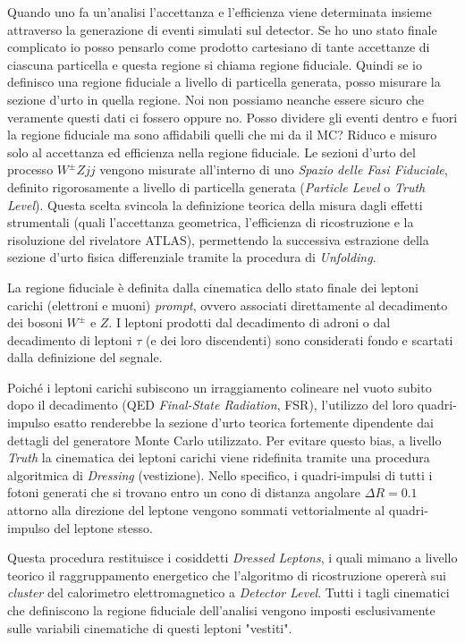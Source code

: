 \documentclass[11pt]{article}
\begin{document}
Quando uno fa un'analisi l'accettanza e l'efficienza viene determinata insieme attraverso la generazione di eventi simulati sul detector. Se ho uno stato finale complicato io posso pensarlo come prodotto cartesiano di tante accettanze di ciascuna particella e questa regione si chiama regione fiduciale. Quindi se io definisco una regione fiduciale a livello di particella generata, posso misurare la sezione d'urto in quella regione. Noi non possiamo neanche essere sicuro che veramente questi dati ci fossero oppure no. Posso dividere gli eventi dentro e fuori la regione fiduciale ma sono affidabili quelli che mi da il MC? Riduco e misuro solo al accettanza ed efficienza nella regione fiduciale.
Le sezioni d'urto del processo $W^\pm Zjj$ vengono misurate all'interno di uno \textit{Spazio delle Fasi Fiduciale}, definito rigorosamente a livello di particella generata (\textit{Particle Level} o \textit{Truth Level}). Questa scelta svincola la definizione teorica della misura dagli effetti strumentali (quali l'accettanza geometrica, l'efficienza di ricostruzione e la risoluzione del rivelatore ATLAS), permettendo la successiva estrazione della sezione d'urto fisica differenziale tramite la procedura di \textit{Unfolding}.

La regione fiduciale è definita dalla cinematica dello stato finale dei leptoni carichi (elettroni e muoni) \textit{prompt}, ovvero associati direttamente al decadimento dei bosoni $W^\pm$ e $Z$. I leptoni prodotti dal decadimento di adroni o dal decadimento di leptoni $\tau$ (e dei loro discendenti) sono considerati fondo e scartati dalla definizione del segnale.

Poiché i leptoni carichi subiscono un irraggiamento colineare nel vuoto subito dopo il decadimento (QED \textit{Final-State Radiation}, FSR), l'utilizzo del loro quadri-impulso esatto renderebbe la sezione d'urto teorica fortemente dipendente dai dettagli del generatore Monte Carlo utilizzato. Per evitare questo bias, a livello \textit{Truth} la cinematica dei leptoni carichi viene ridefinita tramite una procedura algoritmica di \textit{Dressing} (vestizione). Nello specifico, i quadri-impulsi di tutti i fotoni generati che si trovano entro un cono di distanza angolare $\Delta R = 0.1$ attorno alla direzione del leptone vengono sommati vettorialmente al quadri-impulso del leptone stesso. 

Questa procedura restituisce i cosiddetti \textit{Dressed Leptons}, i quali mimano a livello teorico il raggruppamento energetico che l'algoritmo di ricostruzione opererà sui \textit{cluster} del calorimetro elettromagnetico a \textit{Detector Level}. Tutti i tagli cinematici che definiscono la regione fiduciale dell'analisi vengono imposti esclusivamente sulle variabili cinematiche di questi leptoni "vestiti".
\end{document}
